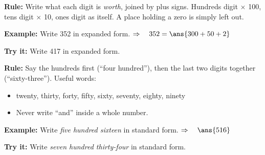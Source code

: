 \documentclass[12pt]{article}
\begin{document}


\begin{formulabox}
\textbf{Rule:} Write what each digit is \emph{worth}, joined by plus signs.
Hundreds digit $\times$ 100, tens digit $\times$ 10, ones digit as itself.
A place holding a zero is simply left out.
\end{formulabox}

\begin{examplebox}
\textbf{Example:} \quad Write 352 in expanded form.
$\Rightarrow\quad 352 = \ans{300 + 50 + 2}$
\end{examplebox}

\begin{tryitbox}
\textbf{Try it:} \quad Write 417 in expanded form.\\[2pt]
\end{tryitbox}


\begin{formulabox}
\textbf{Rule:} Say the hundreds first (``four hundred''), then the last two
digits together (``sixty-three''). Useful words:
\begin{itemize}[leftmargin=1.2cm, itemsep=1pt, topsep=2pt]
  \item twenty, thirty, forty, fifty, sixty, seventy, eighty, ninety
  \item Never write ``and'' inside a whole number.
\end{itemize}
\end{formulabox}

\begin{examplebox}
\textbf{Example:} \quad Write \emph{five hundred sixteen} in standard form.
$\Rightarrow\quad \ans{516}$
\end{examplebox}

\begin{tryitbox}
\textbf{Try it:} \quad Write \emph{seven hundred thirty-four} in standard form.\\[2pt]
\end{tryitbox}
\end{document}
